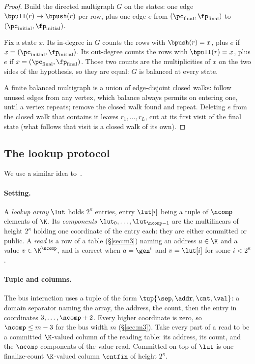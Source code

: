 \begin{proof}
Build the directed multigraph $G$ on the states: one edge $\bpull(r)\to \bpush(r)$ per row, plus one edge $e$ from $(\pc_{\mathrm{final}},\fp_{\mathrm{final}})$ to $(\pc_{\mathrm{initial}},\fp_{\mathrm{initial}})$.

Fix a state $x$. Its in-degree in $G$ counts the rows with $\bpush(r)=x$, plus $e$ if $x=(\pc_{\mathrm{initial}},\fp_{\mathrm{initial}})$. Its out-degree counts the rows with $\bpull(r)=x$, plus $e$ if $x=(\pc_{\mathrm{final}},\fp_{\mathrm{final}})$. Those two counts are the multiplicities of $x$ on the two sides of the hypothesis, so they are equal: $G$ is balanced at every state.

A finite balanced multigraph is a union of edge-disjoint closed walks: follow unused edges from any vertex, which balance always permits on entering one, until a vertex repeats; remove the closed walk found and repeat. Deleting $e$ from the closed walk that contains it leaves $r_1,\dots,r_L$, cut at its first visit of the final state (what follows that visit is a closed walk of its own).
\end{proof}

\subsection{The lookup protocol}\label{sec:lookup}

We use a similar idea to~\cite[Protocol.~4.27]{DP23}.

\paragraph{Setting.} A \emph{lookup array} $\lut$ holds $2^{\kappa}$ entries, entry $\lut[i]$ being a tuple of $\ncomp$ elements of $\K$. Its \emph{components} $\lut_0,\dots,\lut_{\ncomp-1}$ are the multilinears of height $2^{\kappa}$ holding one coordinate of the entry each: they are either committed or public. A \emph{read} is a row of a table (\S\ref{sec:m3}) naming an address $a\in\K$ and a value $v\in\K^{\ncomp}$, and is correct when $a=\gen^{i}$ and $v=\lut[i]$ for some $i<2^{\kappa}$.

\paragraph{Tuple and columns.} The bus interaction uses a tuple of the form $\tup{\sep,\addr,\cnt,\val}$: a domain separator naming the array, the address, the count, then the entry in coordinates $3,\dots,\ncomp+2$. Every higher coordinate is zero, so $\ncomp\le m-3$ for the bus width $m$ (\S\ref{sec:m3}). Take every part of a read to be a committed $\K$-valued column of the reading table: its address, its count, and the $\ncomp$ components of the value read. Committed on top of $\lut$ is one finalize-count $\K$-valued column $\cntfin$ of height $2^{\kappa}$.

